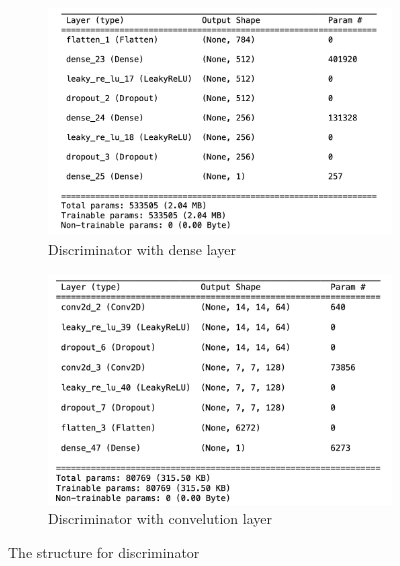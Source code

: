 \begin{figure}[H]
    \centering
    \begin{subfigure}[b]{0.45\linewidth}
        \centering
        \includegraphics[width=\linewidth]{./Images/discriminator_dense.jpg}
        \caption{Discriminator with dense layer}
        \label{fig:Dense}
    \end{subfigure}
    \hspace{0.05\linewidth}
    \begin{subfigure}[b]{0.45\linewidth}
        \centering
        \includegraphics[width=\linewidth]{./Images/discriminator_cnn.jpg}
        \caption{Discriminator with convelution layer}
        \label{fig:Conv2D Transpose}
    \end{subfigure}
    \caption{The structure for discriminator}
    \label{fig:combined}
\end{figure}


